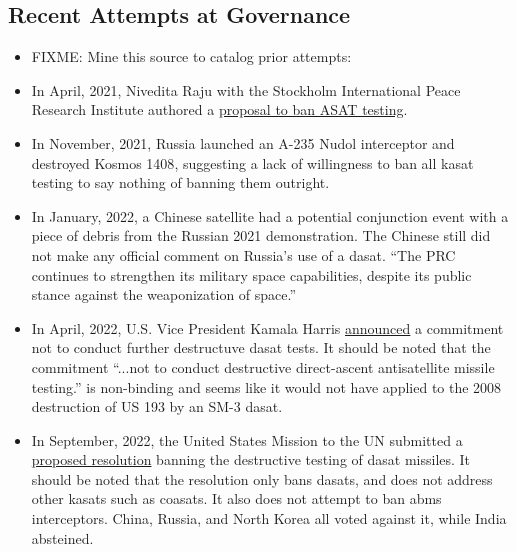 \subsection{Recent Attempts at Governance}
\label{section::governance::prior}
\begin{itemize}

\item FIXME: Mine this source to catalog prior attempts:
  \cite{early-to-call}

\item In April, 2021, Nivedita Raju with the Stockholm International
  Peace Research Institute authored a
  \href{https://www.sipri.org/sites/default/files/2021-04/eunpdc_no_74.pdf}{
    proposal to ban ASAT testing}.\cite{eu-ban}

\item In November, 2021, Russia launched an A-235 Nudol interceptor
  and destroyed Kosmos 1408\cite{brian}, suggesting a lack of
  willingness to ban all \ac{kasat} testing to say nothing of banning
  them outright.

\item In January, 2022, a Chinese satellite had a potential
  conjunction event with a piece of debris from the Russian 2021
  demonstration.\cite{mums-the-china} The Chinese still did not make
  any official comment on Russia's use of a
  \ac{dasat}.\cite{mums-the-china} ``The PRC continues to strengthen
  its military space capabilities, despite its public stance against
  the weaponization of space.''\cite[p66]{osd-china-21}

\item In April, 2022, U.S. Vice President Kamala Harris
  \href{https://www.youtube.com/watch?v=ZANjCHvSEpM}{announced} a
  commitment not to conduct further destructuve \ac{dasat}
  tests.\cite{kamala-pinky-swears} It should be noted that the
  commitment ``...not to conduct destructive direct-ascent
  antisatellite missile testing.'' is non-binding and seems like it
  would not have applied to the 2008 destruction of US 193 by an SM-3
  \ac{dasat}.

\item In September, 2022, the United States Mission to the UN
  submitted a
  \href{https://uploads.mwp.mprod.getusinfo.com/uploads/sites/25/2022/09/US-ASAT-Documents-1-1.pdf}{proposed
    resolution} banning the destructive testing of \ac{dasat}
  missiles.\cite{un-asat-me-not} It should be noted that the
  resolution only bans \aclp{dasat}, and does not address other
  \aclp{kasat} such as \aclp{coasat}.\cite{un-asat-me-not} It also
  does not attempt to ban \acp{abm} interceptors.\cite{un-asat-me-not}
  China, Russia, and North Korea all voted against it, while India
  absteined.\cite{not-so-chinese}

\end{itemize}


